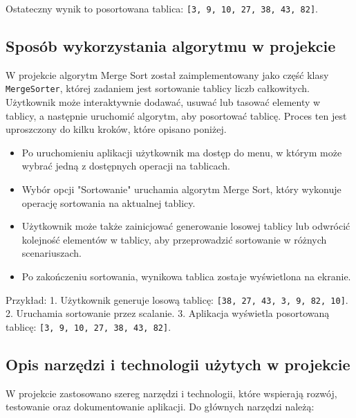 Ostateczny wynik to posortowana tablica: \texttt{[3, 9, 10, 27, 38, 43, 82]}.

\subsection{Sposób wykorzystania algorytmu w projekcie}

W projekcie algorytm Merge Sort został zaimplementowany jako część klasy \texttt{MergeSorter}, której zadaniem jest sortowanie tablicy liczb całkowitych. Użytkownik może interaktywnie dodawać, usuwać lub tasować elementy w tablicy, a następnie uruchomić algorytm, aby posortować tablicę. Proces ten jest uproszczony do kilku kroków, które opisano poniżej.

\begin{itemize}
  \item Po uruchomieniu aplikacji użytkownik ma dostęp do menu, w którym może wybrać jedną z dostępnych operacji na tablicach.
  \item Wybór opcji "Sortowanie" uruchamia algorytm Merge Sort, który wykonuje operację sortowania na aktualnej tablicy.
  \item Użytkownik może także zainicjować generowanie losowej tablicy lub odwrócić kolejność elementów w tablicy, aby przeprowadzić sortowanie w różnych scenariuszach.
  \item Po zakończeniu sortowania, wynikowa tablica zostaje wyświetlona na ekranie.
\end{itemize}

Przykład:
1. Użytkownik generuje losową tablicę: \texttt{[38, 27, 43, 3, 9, 82, 10]}.
2. Uruchamia sortowanie przez scalanie.
3. Aplikacja wyświetla posortowaną tablicę: \texttt{[3, 9, 10, 27, 38, 43, 82]}.

\subsection{Opis narzędzi i technologii użytych w projekcie}

W projekcie zastosowano szereg narzędzi i technologii, które wspierają rozwój, testowanie oraz dokumentowanie aplikacji. Do głównych narzędzi należą:

